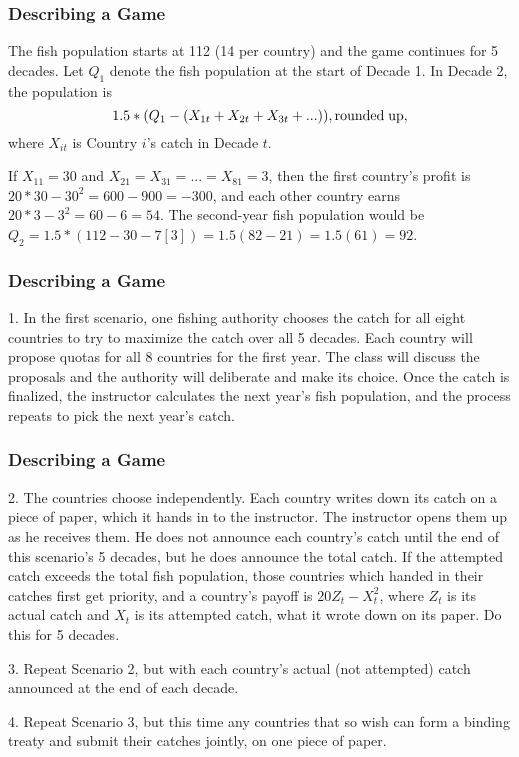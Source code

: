  \begin{frame}[fragile]\frametitle{Describing a Game}
	 The fish population starts at 112 (14 per country)  and the game
continues for 5 decades. Let $Q_1$ denote the fish population at the start of
Decade 1. In Decade 2, the population is
\begin{equation} \label{e101}
1.5*( Q_1 - (X_{1t} + X_{2t} + X_{3t} +...)), {\rm rounded \; up,}
 \end{equation}
 where $X_{it}$ is Country $i$'s catch in Decade $t$.


   If  $ X_{11} = 30$ and $X_{21} =X_{31}=...=X_{81}= 3$, then the first
country's profit is $20*30-30^2 = 600-900 = -300$, and each other country earns
$20*3-3^2 = 60-6 = 54$.   The second-year fish population would be $Q_2=
1.5*(112-30 - 7[3])= 1.5(82-21) = 1.5(61) = 92$.


\end{frame}
 \begin{frame}[fragile]\frametitle{Describing a Game}

 1. In the first scenario, one fishing authority chooses the catch for all eight
countries to try to maximize the catch over all 5 decades.  Each country will
propose quotas for all 8 countries for the first year. The class will discuss
the proposals and the authority will  deliberate and  make its choice.    Once
the  catch is finalized, the instructor calculates the next year's fish
population, and the  process repeats to pick the next year's catch.

\end{frame}
 \begin{frame}[fragile]\frametitle{Describing a Game}
 
2. The  countries choose independently. Each country writes down its catch  on a
piece  of paper, which it hands in to the instructor. The instructor opens them
up as he receives them. He does not announce each country's catch until the end
of this scenario's 5 decades, but he does announce the total catch. If the
attempted catch exceeds the total fish population, those countries which handed
in their catches first get priority, and a country's payoff is $20Z_t - X_t^2$,
where $Z_t$ is its actual catch and $X_t$ is its attempted catch, what it wrote
down on its paper. Do this for 5 decades.

3. Repeat   Scenario 2, but with  each country's  actual (not attempted) catch
announced at the end of each decade.

4. Repeat Scenario 3,  but this time   any countries that so wish can  form a
binding treaty and submit their catches jointly, on one piece of paper.


\end{frame}



